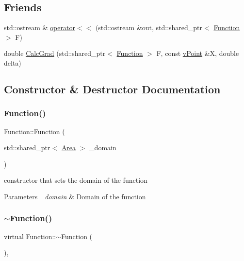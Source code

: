\subsection*{Friends}
\begin{DoxyCompactItemize}
\item 
std\+::ostream \& \hyperlink{class_function_ada3899626dabeaf7910d55f156499baf}{operator$<$$<$} (std\+::ostream \&out, std\+::shared\+\_\+ptr$<$ \hyperlink{class_function}{Function} $>$ F)
\item 
double \hyperlink{class_function_a74f93e0ab18699467c6a96e4c500b256}{Calc\+Grad} (std\+::shared\+\_\+ptr$<$ \hyperlink{class_function}{Function} $>$ F, const \hyperlink{classv_point}{v\+Point} \&X, double delta)
\end{DoxyCompactItemize}


\subsection{Constructor \& Destructor Documentation}
\mbox{\label{class_function_a28c4db5ca9f2bbe27fd51ed0169bd2de}} 
\subsubsection{\texorpdfstring{Function()}{Function()}}
{\footnotesize\ttfamily Function\+::\+Function (\begin{DoxyParamCaption}\item[{std\+::shared\+\_\+ptr$<$ \hyperlink{class_area}{Area} $>$}]{\+\_\+domain }\end{DoxyParamCaption})\hspace{0.3cm}{\ttfamily [inline]}}

constructor that sets the domain of the function 
\begin{DoxyParams}{Parameters}
{\em \+\_\+domain} & Domain of the function \\
\hline
\end{DoxyParams}
\mbox{\label{class_function_a8697b2e490a4314a7ccbb17aea8ce537}} 
\subsubsection{\texorpdfstring{$\sim$\+Function()}{~Function()}}
{\footnotesize\ttfamily virtual Function\+::$\sim$\+Function (\begin{DoxyParamCaption}{ }\end{DoxyParamCaption})\hspace{0.3cm}{\ttfamily [inline]}, {\ttfamily [virtual]}}

